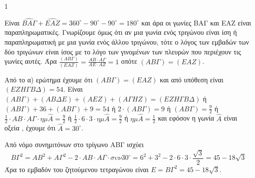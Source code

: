 \begin{ylh}{1}
    \item [ΛΥΣΗ]
\end{ylh}
\begin{figure}
\centering
{}
\end{figure}

\begin{alist}
\item Είναι $\widehat{ΒΑΓ}+\widehat{ΕΑΖ}=360^\circ-90^\circ-90^\circ=180^\circ$ και άρα οι γωνίες ΒΑΓ και ΕΑΖ είναι παραπληρωματικές. Γνωρίζουμε όμως ότι αν μια γωνία ενός τριγώνου είναι ίση ή παραπληρωματική με μια γωνία ενός άλλου τριγώνου, τότε ο λόγος των εμβαδών των δύο τριγώνων είναι ίσος με το λόγο των γινομένων των πλευρών που περιέχουν τις γωνίες αυτές. Άρα $\displaystyle \frac{(ΑΒΓ)}{(ΕΑΖ)} = \frac{ΑΒ \cdot ΑΓ}{ΑΕ \cdot ΑΖ} = 1$ οπότε $(ΑΒΓ)=(ΕΑΖ)$.

\item 
\begin{rlist}
\item Από το α) ερώτημα έχουμε ότι $(ΑΒΓ)=(ΕΑΖ)$ και από υπόθεση είναι $(ΕΖΗΓΒΔ)=54$. Είναι $(ΑΒΓ)+(ΑΒΔΕ)+(ΑΕΖ)+(ΑΓΗΖ)=(ΕΖΗΓΒΔ)$ ή $(ΑΒΓ)+36+(ΑΒΓ)+9=54$ ή $2 \cdot (ΑΒΓ)=9$ ή $(ΑΒΓ)=\frac{9}{2}$ ή $\frac{1}{2} \cdot ΑΒ \cdot ΑΓ \cdot \eta\mu\widehat{Α} = \frac{9}{2}$ ή $\frac{1}{2} \cdot 6 \cdot 3 \cdot \eta\mu\widehat{Α} = \frac{9}{2}$ ή $\eta\mu\widehat{Α}=\frac{1}{2}$ και εφόσον η γωνία $\widehat{Α}$ είναι οξεία , έχουμε ότι $\widehat{Α}=30^\circ$.

\item Από νόμο συνημιτόνων στο τρίγωνο ΑΒΓ ισχύει
\[ ΒΓ^2=ΑΒ^2+ΑΓ^2-2 \cdot ΑΒ \cdot ΑΓ \cdot \sigma\upsilon\nu30^\circ=6^2+3^2-2 \cdot 6 \cdot 3 \cdot \frac{\sqrt{3}}{2}=45-18\sqrt{3} \]
Άρα το εμβαδόν του ζητούμενου τετραγώνου είναι $E=ΒΓ^2=45-18\sqrt{3}$.
\end{rlist}
\end{alist}